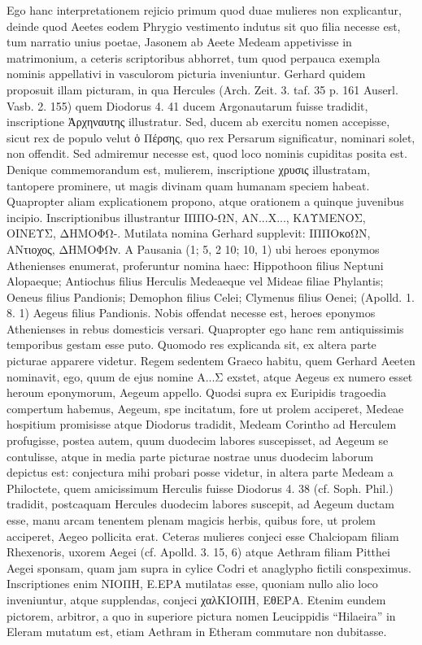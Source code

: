 \documentclass[landscape, a4paper, 11pt, oneside, polutonikogreek, german]{article}
\begin{document}
Ego hanc interpretationem rejicio primum quod duae mulieres non explicantur, deinde quod Aeetes eodem Phrygio vestimento indutus sit quo filia necesse est, tum narratio unius poetae, Jasonem ab Aeete Medeam appetivisse in matrimonium, a ceteris scriptoribus abhorret, tum quod perpauca exempla nominis appellativi in vasculorom picturia inveniuntur. Gerhard quidem proposuit illam picturam, in qua Hercules (Arch. Zeit. 3. taf. 35 p. 161 Auserl. Vasb. 2. 155) quem Diodorus 4. 41 ducem Argonautarum fuisse tradidit, inscriptione Ἀρχηναυτης illustratur. Sed, ducem ab exercitu nomen accepisse, sicut rex de populo velut ὁ Πέρσης, quo rex Persarum significatur, nominari solet, non offendit. Sed admiremur necesse est, quod loco nominis cupiditas posita est. Denique commemorandum est, mulierem, inscriptione χρυσις illustratam, tantopere prominere, ut magis divinam quam humanam speciem habeat. Quapropter aliam explicationem propono, atque orationem a quinque juvenibus incipio. Inscriptionibus illustrantur ΙΠΠΟ-ΩΝ, ΑΝ...Χ..., ΚΛΥΜΕΝΟΣ, ΟΙΝΕΥΣ, ΔΗΜΟΦΩ-. Mutilata nomina Gerhard supplevit: ΙΠΠΟκοΩΝ, ΑΝτιοχος, ΔΗΜΟΦΩν. A Pausania (1; 5, 2 10; 10, 1) ubi heroes eponymos Athenienses enumerat, proferuntur nomina haec: Hippothoon filius Neptuni Alopaeque; Antiochus filius Herculis Medeaeque vel Mideae filiae Phylantis; Oeneus filius Pandionis; Demophon filius Celei; Clymenus filius Oenei; (Apolld. 1. 8. 1) Aegeus filius Pandionis. Nobis offendat necesse est, heroes eponymos Athenienses in rebus domesticis versari. Quapropter ego hanc rem antiquissimis temporibus gestam esse puto. Quomodo res explicanda sit, ex altera parte picturae apparere videtur. Regem sedentem Graeco habitu, quem Gerhard Aeeten nominavit, ego, quum de ejus nomine Α...Σ exstet, atque Aegeus ex numero esset heroum eponymorum, Aegeum appello. Quodsi supra ex Euripidis tragoedia compertum habemus, Aegeum, spe incitatum, fore ut prolem acciperet, Medeae hospitium promisisse atque Diodorus tradidit, Medeam Corintho ad Herculem profugisse, postea autem, quum duodecim labores suscepisset, ad Aegeum se contulisse, atque in media parte picturae nostrae unus duodecim laborum depictus est: conjectura mihi probari posse videtur, in altera parte Medeam a Philoctete, quem amicissimum Herculis fuisse Diodorus 4. 38 (cf. Soph. Phil.) tradidit, postcaquam Hercules duodecim labores suscepit, ad Aegeum ductam esse, manu arcam tenentem plenam magicis herbis, quibus fore, ut prolem acciperet, Aegeo pollicita erat. Ceteras mulieres conjeci esse Chalciopam filiam Rhexenoris, uxorem Aegei (cf. Apolld. 3. 15, 6) atque Aethram filiam Pitthei Aegei sponsam, quam jam supra in cylice Codri et anaglypho fictili conspeximus. Inscriptiones enim ΝΙΟΠΗ, Ε.ΕΡΑ mutilatas esse, quoniam nullo alio loco inveniuntur, atque supplendas, conjeci χαλΚΙΟΠΗ, ΕθΕΡΑ. Etenim eundem pictorem, arbitror, a quo in superiore pictura nomen Leucippidis "`Hilaeira"' in Eleram mutatum est, etiam Aethram in Etheram commutare non dubitasse.
\end{document}

